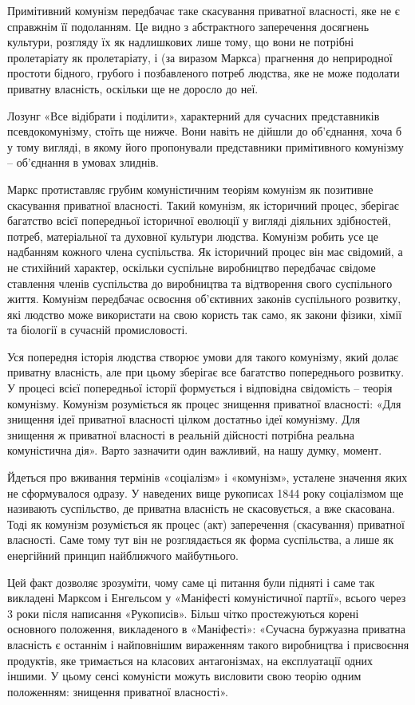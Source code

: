 \documentclass[12pt,a4paper,openany]{book}
\begin{document}
Примітивний комунізм передбачає таке скасування приватної власності, яке не є справжнім її подоланням. Це видно з абстрактного заперечення досягнень культури, розгляду їх як надлишкових лише тому, що вони не потрібні пролетаріату як пролетаріату, і (за виразом Маркса) прагнення до неприродної простоти бідного, грубого і позбавленого потреб людства, яке не може подолати приватну власність, оскільки ще не доросло до неї.

Лозунг «Все відібрати і поділити», характерний для сучасних представників псевдокомунізму, стоїть ще нижче. Вони навіть не дійшли до об’єднання, хоча б у тому вигляді, в якому його пропонували представники примітивного комунізму – об’єднання в умовах злиднів.

Маркс протиставляє грубим комуністичним теоріям комунізм як позитивне скасування приватної власності. Такий комунізм, як історичний процес, зберігає багатство всієї попередньої історичної еволюції у вигляді діяльних здібностей, потреб, матеріальної та духовної культури людства. Комунізм робить усе це надбанням кожного члена суспільства. Як історичний процес він має свідомий, а не стихійний характер, оскільки суспільне виробництво передбачає свідоме ставлення членів суспільства до виробництва та відтворення свого суспільного життя. Комунізм передбачає освоєння об’єктивних законів суспільного розвитку, які людство може використати на свою користь так само, як закони фізики, хімії та біології в сучасній промисловості.

Уся попередня історія людства створює умови для такого комунізму, який долає приватну власність, але при цьому зберігає все багатство попереднього розвитку. У процесі всієї попередньої історії формується і відповідна свідомість – теорія комунізму. Комунізм розуміється як процес знищення приватної власності: «Для знищення ідеї приватної власності цілком достатньо ідеї комунізму. Для знищення ж приватної власності в реальній дійсності потрібна реальна комуністична дія». Варто зазначити один важливий, на нашу думку, момент.

Йдеться про вживання термінів «соціалізм» і «комунізм», усталене значення яких не сформувалося одразу. У наведених вище рукописах 1844 року соціалізмом ще називають суспільство, де приватна власність не скасовується, а вже скасована. Тоді як комунізм розуміється як процес (акт) заперечення (скасування) приватної власності. Саме тому тут він не розглядається як форма суспільства, а лише як енергійний принцип найближчого майбутнього.

Цей факт дозволяє зрозуміти, чому саме ці питання були підняті і саме так викладені Марксом і Енгельсом у «Маніфесті комуністичної партії», всього через 3 роки після написання «Рукописів». Більш чітко простежуються корені основного положення, викладеного в «Маніфесті»: «Сучасна буржуазна приватна власність є останнім і найповнішим вираженням такого виробництва і присвоєння продуктів, яке тримається на класових антагонізмах, на експлуатації одних іншими. У цьому сенсі комуністи можуть висловити свою теорію одним положенням: знищення приватної власності».
\end{document}
